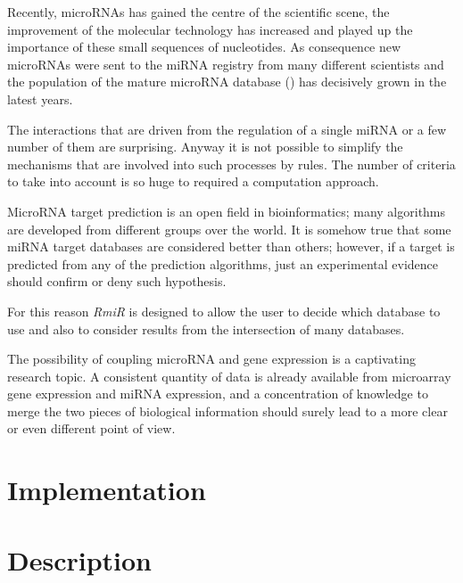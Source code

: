 \documentclass{bioinfo}
\begin{document}
\begin{application}
Recently, microRNAs has gained the centre of the scientific scene, the improvement of the molecular technology has increased and played up the importance of these small sequences of nucleotides. As consequence new microRNAs were sent to the miRNA registry from many different scientists and the population of the mature microRNA database (\cite{mirbase2006}) has decisively grown in the latest years.  
\par The interactions that are driven from the regulation of a single miRNA or a few number of them are surprising. Anyway it is not possible to simplify the mechanisms that are involved into such processes by rules. The number of criteria to take into account is so huge to required a computation approach.
\par MicroRNA target prediction is an open field in bioinformatics; many algorithms are developed from different groups over the world. It is somehow true that some miRNA target databases are considered better than others; however, if a target is predicted from any of the prediction algorithms, just an experimental evidence should confirm or deny such hypothesis.
\par For this reason \textit{RmiR} is designed to allow the user to decide which database to use and also to consider results from the intersection of many databases.
\par The possibility of coupling microRNA and gene expression is a captivating research topic. A consistent quantity of data is already available from microarray gene expression and miRNA expression, and a concentration of knowledge to merge the two pieces of biological information should surely lead to a more clear or even different point of view.



\section*{Implementation}

\section*{Description}


\end{application}
\end{document}
